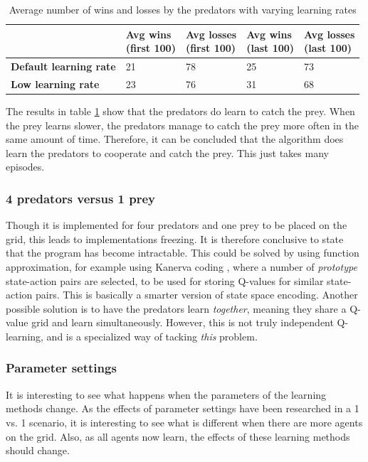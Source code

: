 \begin{table}[H]
\begin{center}
\begin{tabular}{| l | l | l | l | l |}
\hline
 & \parbox{2cm}{\textbf{Avg wins \\ (first 100)}} & \parbox{2cm}{\textbf{Avg losses \\ (first 100)}} & \parbox{2cm}{\textbf{Avg wins \\ (last 100)}} & \parbox{2cm}{\textbf{Avg losses \\ (last 100)}} \\
\hline
\textbf{Default learning rate} & 21 & 78 & 25 & 73 \\
\hline
\textbf{Low learning rate} & 23 & 76 & 31 & 68 \\
\hline
\end{tabular}
\caption{Average number of wins and losses by the predators with varying learning rates}
\label{table:3vs1}
\end{center}
\end{table}

The results in table \ref{table:3vs1} show that the predators do learn to catch the prey. When the prey learns slower, the predators manage to catch the prey more often in the same amount of time. Therefore, it can be concluded that the algorithm does learn the predators to cooperate and catch the prey. This just takes many episodes.

\subsubsection{4 predators versus 1 prey}
Though it is implemented for four predators and one prey to be placed on the grid, this leads to implementations freezing. It is therefore conclusive to state that the program has become intractable. This could be solved by using function approximation, for example using Kanerva coding \cite{wu2009function}, where a number of \textit{prototype} state-action pairs are selected, to be used for storing Q-values for similar state-action pairs.  This is basically a smarter version of state space encoding. Another possible solution is to have the predators learn \textit{together}, meaning they share a Q-value grid and learn simultaneously. However, this is not truly independent Q-learning, and is a specialized way of tacking \textit{this} problem. 

\subsubsection{Parameter settings}
It is interesting to see what happens when the parameters of the learning methods change. As the effects of parameter settings have been researched in a 1 vs. 1 scenario, it is interesting to see what is different when there are more agents on the grid. Also, as all agents now learn, the effects of these learning methods should change.

